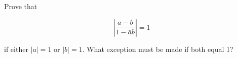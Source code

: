 Prove that

$$|\frac{a-b}{1-\bar{a}b}|=1$$

if either $|a|=1$ or $|b|=1$. What exception must be made if both equal 1?\\

\begin{solution}\renewcommand{\qedsymbol}{}\ \\

    

\end{solution}